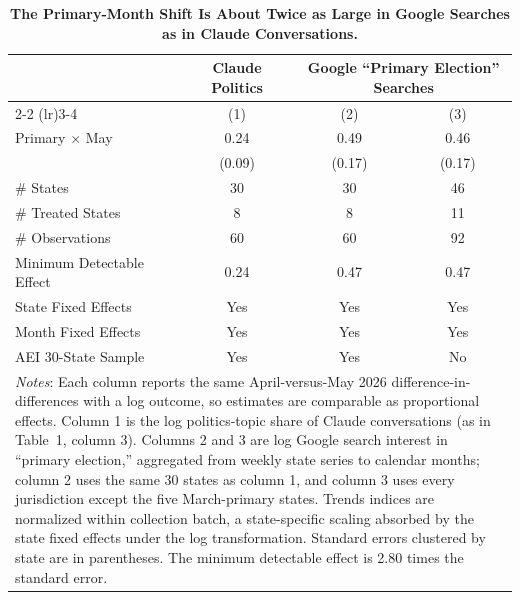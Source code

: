 \begin{table}[t]
\centering
\caption{\textbf{The Primary-Month Shift Is About Twice as Large in Google Searches as in Claude Conversations.}\label{tab:search_did}}
\begin{tabular}{lccc}
\toprule \toprule
 & Claude Politics & \multicolumn{2}{c}{Google ``Primary Election'' Searches} \\
\cmidrule(lr){2-2} \cmidrule(lr){3-4}
 & (1) & (2) & (3) \\
\midrule
Primary $\times$ May & 0.24 & 0.49 & 0.46 \\
 & (0.09) & (0.17) & (0.17) \\[2mm]
\# States & 30 & 30 & 46 \\
\# Treated States & 8 & 8 & 11 \\
\# Observations & 60 & 60 & 92 \\
Minimum Detectable Effect & 0.24 & 0.47 & 0.47 \\
\midrule
State Fixed Effects & Yes & Yes & Yes \\
Month Fixed Effects & Yes & Yes & Yes \\
AEI 30-State Sample & Yes & Yes & No \\
\bottomrule \bottomrule
\multicolumn{4}{p{0.95\textwidth}}{\footnotesize \textit{Notes}: Each column reports the same April-versus-May 2026 difference-in-differences with a log outcome, so estimates are comparable as proportional effects. Column 1 is the log politics-topic share of Claude conversations (as in Table~1, column 3). Columns 2 and 3 are log Google search interest in ``primary election,'' aggregated from weekly state series to calendar months; column 2 uses the same 30 states as column 1, and column 3 uses every jurisdiction except the five March-primary states. Trends indices are normalized within collection batch, a state-specific scaling absorbed by the state fixed effects under the log transformation. Standard errors clustered by state are in parentheses. The minimum detectable effect is 2.80 times the standard error.} \\
\end{tabular}
\end{table}
